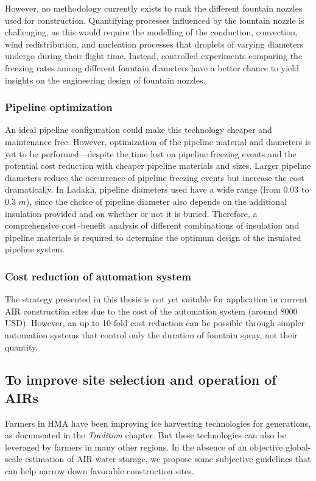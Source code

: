 However, no methodology currently exists to rank the different fountain nozzles used for construction. Quantifying
processes influenced by the fountain nozzle is challenging, as this would require the modelling of the conduction,
convection, wind redistribution, and nucleation processes that droplets of varying diameters undergo during
their flight time. Instead, controlled experiments comparing the freezing rates among different fountain
diameters have a better chance to yield insights on the engineering design of fountain nozzles.

\subsubsection{Pipeline optimization}

An ideal pipeline configuration could make this technology cheaper and maintenance free. However, optimization
of the pipeline material and diameters is yet to be performed---despite the time lost on pipeline freezing
events and the potential cost reduction with cheaper pipeline materials and sizes. Larger pipeline diameters
reduce the occurrence of pipeline freezing events but increase the cost dramatically. In Ladakh, pipeline
diameters used have a wide range (from 0.03 to 0.3 $m$), since the choice of pipeline diameter also depends on
the additional insulation provided and on whether or not it is buried. Therefore, a comprehensive cost--benefit
analysis of different combinations of insulation and pipeline materials is required to determine the optimum
design of the insulated pipeline system.

\subsubsection{Cost reduction of automation system}

The strategy presented in this thesis is not yet suitable for application in current \ac{AIR} construction sites
due to the cost of the automation system (around 8000 USD). However, an up to 10-fold cost reduction can be
possible through simpler automation systems that control only the duration of fountain spray, not their
quantity. 

\subsection{To improve site selection and operation of AIRs }

Farmers in \ac{HMA} have been improving ice harvesting technologies for generations, as documented in the
\textit{Tradition} chapter. But these technologies can also be leveraged by farmers in many other regions. In the
absence of an objective global-scale estimation of \ac{AIR} water storage, we propose some subjective guidelines
that can help narrow down favorable construction sites.

